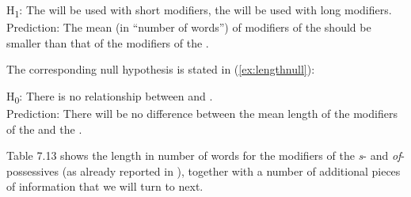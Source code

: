 \begin{exe}
\ex H\textsubscript{1}: The  will be used with short modifiers, the  will be used with long modifiers. \\[1.5ex]
Prediction: The mean    (in ``number of words'') of modifiers of the   should be smaller than that of the modifiers of the .
\label{ex:lengthalternative}
\end{exe}

The corresponding null hypothesis  is stated in (\ref{ex:lengthnull}):

\begin{exe}
\ex H\textsubscript{0}: There is no relationship between   and .  \\[1.5ex]
Prediction: There will be no difference between the mean  length of the modifiers of the  and the .
\label{ex:lengthnull}
\end{exe}

Table 7.13 shows the length  in number of words for the modifiers of the \textit{s}- and \textit{of}-possessives  (as already reported in ), together with a number of additional pieces of information that we will turn to next.

